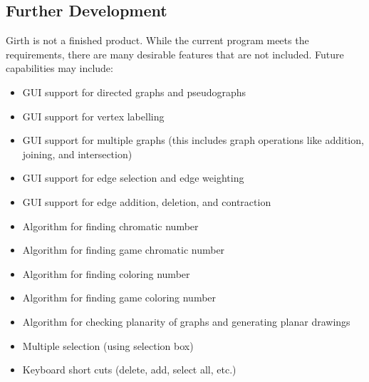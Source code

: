 \documentclass{article}
\begin{document}
\subsection{Further Development}

Girth is not a finished product. While the current program meets the requirements,
there are many desirable features that are not included.
Future capabilities may include:
\begin{itemize}
  \item GUI support for directed graphs and pseudographs
  \item GUI support for vertex labelling
  \item GUI support for multiple graphs (this includes graph operations like addition, joining, and intersection)
  \item GUI support for edge selection and edge weighting
  \item GUI support for edge addition, deletion, and contraction
  \item Algorithm for finding chromatic number
  \item Algorithm for finding game chromatic number
  \item Algorithm for finding coloring number
  \item Algorithm for finding game coloring number
  \item Algorithm for checking planarity of graphs and generating planar drawings
  \item Multiple selection (using selection box)
  \item Keyboard short cuts (delete, add, select all, etc.)
\end{itemize}
\end{document}
